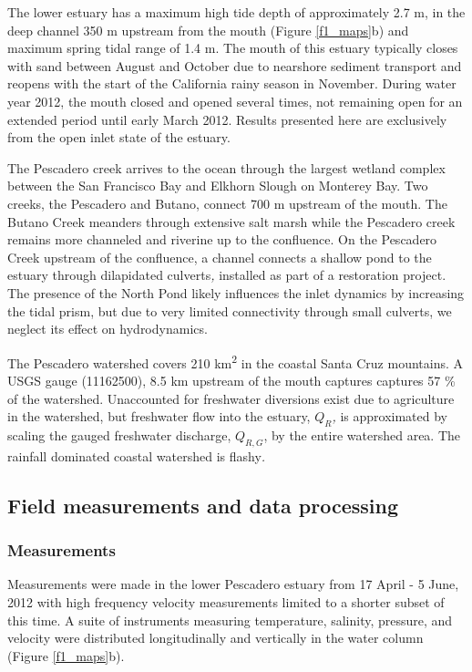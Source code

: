 The lower estuary has a maximum high tide depth of approximately 2.7
m, in the deep channel 350 m upstream from the mouth (Figure \ref{f1_maps}b)\emph{
}and maximum spring tidal range of 1.4 m. The mouth of this estuary
typically closes with sand between August and October due to nearshore
sediment transport and reopens with the start of the California rainy
season in November. During water year 2012, the mouth closed and opened
several times, not remaining open for an extended period until early
March 2012. Results presented here are exclusively from the open inlet
state of the estuary. 

The Pescadero creek arrives to the ocean through the largest wetland
complex between the San Francisco Bay and Elkhorn Slough on Monterey
Bay. Two creeks, the Pescadero and Butano, connect 700 m upstream
of the mouth. The Butano Creek meanders through extensive salt marsh
while the Pescadero creek remains more channeled and riverine up to
the confluence. On the Pescadero Creek upstream of the confluence,
a channel connects a shallow pond to the estuary through dilapidated
culverts\emph{, }installed as part of a restoration project. The presence
of the North Pond likely influences the inlet dynamics by increasing
the tidal prism, but due to very limited connectivity through small
culverts, we neglect its effect on hydrodynamics.

The Pescadero watershed covers 210 km\textsuperscript{2} in the coastal
Santa Cruz mountains. A USGS gauge (11162500), 8.5 km upstream of
the mouth captures captures 57 \% of the watershed. Unaccounted for
freshwater diversions exist due to agriculture in the watershed, but
freshwater flow into the estuary, \emph{$Q_{R}$, }is approximated
by scaling the gauged freshwater discharge, $Q_{R,G}$, by the entire
watershed area. The rainfall dominated coastal watershed is flashy\emph{.}


\subsection{Field measurements and data processing}


\subsubsection{Measurements}

Measurements were made in the lower Pescadero estuary from 17 April
- 5 June, 2012 with high frequency velocity measurements limited to
a shorter subset of this time. A suite of instruments measuring temperature,
salinity, pressure, and velocity were distributed longitudinally and
vertically in the water column (Figure \ref{f1_maps}b).

